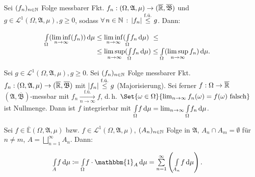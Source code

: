 \documentclass{cheat-sheet}
\newcommand{\Alg}{\mathfrak{A}} %
\newcommand{\Bor}{\mathfrak{B}} %
\newcommand{\E}{\mathbb{E}} %
\newcommand{\Leb}{\mathcal{L}} %
\newcommand{\ind}{\mathbbm{1}} %
\theoremstyle{definition}
\newcommand{\IntOmu}[1]{\Int{\Omega}{}{#1}{\mu}} %
\begin{document}

\vspace{-20pt}

\begin{satz}
  \begin{doublespace}
    Sei $(f_n)_{n \in \mathbb{N}}$ Folge messbarer Fkt. $f_n : (\Omega, \Alg, \mu) \to (\ER, \overline{\Bor})$ und $g \in \Leb^1(\Omega, \Alg, \mu), g \geq 0$, sodass $\forall \, {n \in \mathbb{N}} \,:\, \lvert f_n\rvert \overset{\text{f.ü.}}\leq g$. Dann:\\[-16pt]
  \end{doublespace}
  \begin{align*}
    \IntOmu{(\liminf_{n \to \infty} (f_n))}
    &\leq \liminf_{n \to \infty} (\IntOmu{f_n}) \,\,\leq\\[-5pt]
    &\leq \limsup_{n \to \infty} (\IntOmu{f_n})
    \leq \IntOmu{(\limsup_{n \to \infty} f_n)}.
  \end{align*}
\end{satz}

\begin{satz}\begin{doublespace}
  Sei $g \in \Leb^1(\Omega, \Alg, \mu), g \geq 0$. Sei $(f_n)_{n \in \mathbb{N}}$ Folge messbarer Fkt. $f_n : (\Omega, \Alg, \mu) \to (\ER, \overline{\Bor})$ mit $\lvert f_n\rvert \overset{\text{f.ü.}}\leq g$ (Majorisierung).
  Sei ferner $f : \Omega \to \overline{\mathbb{R}}$ $(\Alg, \overline{\Bor})$-messbar mit $f_n \xrightarrow[n \to \infty]{\text{f.ü.}} f$, d.\,h. $\Set{ \omega \in \Omega }{ \lim_{n \to \infty} f_n(\omega) = f(\omega) \text{ falsch} }$ ist Nullmenge. Dann ist $f$ integrierbar mit $\IntOmu{f} = \lim_{n \to \infty} \IntOmu{f_n}$.
\end{doublespace}\end{satz}

\vspace{-20pt}

\begin{satz}
  \begin{doublespace}
    Sei $f \in \overline{\E}(\Omega, \Alg, \mu)$ bzw. $f \in \Leb^1(\Omega, \Alg, \mu)$, $(A_n)_{n \in \mathbb{N}}$ Folge in $\Alg$, $A_n \cap A_m = \emptyset$ für $n \not= m$, $A = \bigsqcup_{n=1}^\infty A_n$. Dann:\\[-10pt]
  \end{doublespace}
  \[ \Int{A}{}{f}{\mu} \coloneqq \IntOmu{f \cdot \ind_A} = \sum_{n=1}^\infty \left( \Int{A_n}{}{f}{\mu} \right). \]
\end{satz}
\end{document}

